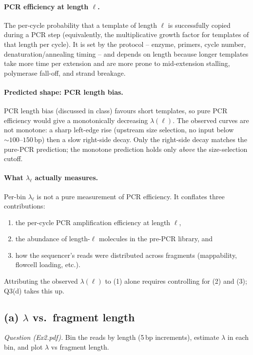 \documentclass[11pt,a4paper]{article}
\begin{document}
\paragraph{PCR efficiency at length $\ell$.}
The per-cycle probability that a template of length $\ell$ is successfully
copied during a PCR step (equivalently, the multiplicative growth factor for
templates of that length per cycle). It is set by the protocol -- enzyme,
primers, cycle number, denaturation/annealing timing -- and depends on length
because longer templates take more time per extension and are more prone to
mid-extension stalling, polymerase fall-off, and strand breakage.

\paragraph{Predicted shape: PCR length bias.}
PCR length bias (discussed in class) favours short templates, so pure PCR
efficiency would give a monotonically decreasing $\lambda(\ell)$. The observed
curves are not monotone: a sharp left-edge rise (upstream size selection, no
input below $\sim 100$--$150\,\text{bp}$) then a slow right-side decay. Only
the right-side decay matches the pure-PCR prediction; the monotone prediction
holds only \emph{above} the size-selection cutoff.

\paragraph{What $\lambda_\ell$ actually measures.}
Per-bin $\lambda_\ell$ is not a pure measurement of PCR efficiency. It conflates
three contributions:
\begin{enumerate}[leftmargin=2em,itemsep=2pt]
  \item the per-cycle PCR amplification efficiency at length $\ell$,
  \item the abundance of length-$\ell$ molecules in the pre-PCR library, and
  \item how the sequencer's reads were distributed across fragments (mappability,
        flowcell loading, etc.).
\end{enumerate}
Attributing the observed $\lambda(\ell)$ to (1) alone requires controlling for
(2) and (3); Q3(d) takes this up.

\subsection{(a) $\lambda$ vs.\ fragment length}
\emph{Question (Ex2.pdf).} Bin the reads by length (5\,bp increments), estimate
$\lambda$ in each bin, and plot $\lambda$ vs fragment length.
\end{document}

